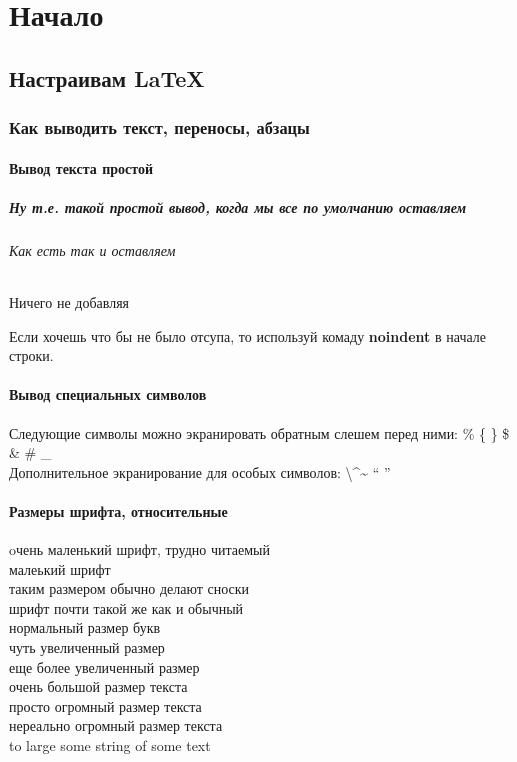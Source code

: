 \documentclass[oneside,final,14pt]{extreport}
\begin{document}
\part{Начало}
\chapter{Настраивам LaTeX}
\section{Как выводить текст, переносы, абзацы}
\subsection{Вывод текста простой}
\subsubsection{Ну т.е. такой простой вывод, когда мы все по умолчанию оставляем}
\paragraph{Как есть так и оставляем}
\subparagraph{Ничего не добавляя}
Если хочешь что бы не было отсупа, то используй комаду
\textbf{noindent} в начале строки.\newline
\subsection{Вывод специальных символов}
Следующие символы можно экранировать обратным слешем
перед ними: \% \{ \} \$ \& \# \_ \\
Дополнительное экранирование для особых
символов: \textbackslash  \textasciicircum \~{}  `` '' \\

\subsection{Размеры шрифта, относительные}
\tiny oчень маленький шрифт, трудно читаемый \\
\scriptsize малеький шрифт \\
\footnotesize таким размером обычно делают сноски \\
\small шрифт почти такой же как и обычный \\
\normalsize нормальный размер букв \\
\large чуть увеличенный размер \\
\Large еще более увеличенный размер \\
\LARGE очень большой размер текста \\
\huge просто огромный размер текста \\
\Huge нереально огромный размер текста \\
\Huge to large some string of some text \\
\normalsize
\end{document}
